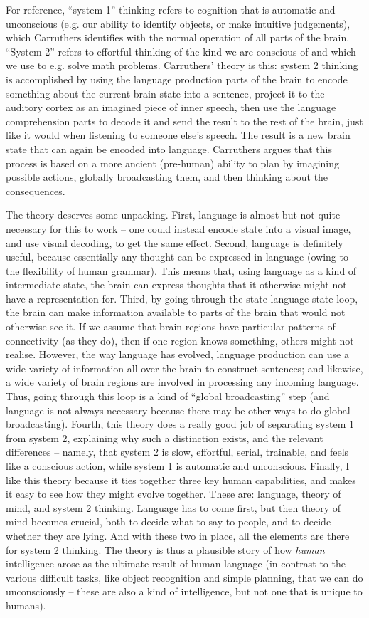 \documentclass[10pt,a4paper]{article}
\newcommand{\nquote}[1]{``{#1}''}
\begin{document}
For reference, \nquote{system 1} thinking refers to cognition that is automatic and unconscious (e.g. our ability to identify objects, or make intuitive judgements), which Carruthers identifies with the normal operation of all parts of the brain. \nquote{System 2} refers to effortful thinking of the kind we are conscious of and which we use to e.g. solve math problems. Carruthers' theory is this: system 2 thinking is accomplished by using the language production parts of the brain to encode something about the current brain state into a sentence, project it to the auditory cortex as an imagined piece of inner speech, then use the language comprehension parts to decode it and send the result to the rest of the brain, just like it would when listening to someone else's speech. The result is a new brain state that can again be encoded into language. Carruthers argues that this process is based on a more ancient (pre-human) ability to plan by imagining possible actions, globally broadcasting them, and then thinking about the consequences.

The theory deserves some unpacking. First, language is almost but not quite necessary for this to work -- one could instead encode state into a visual image, and use visual decoding, to get the same effect. Second, language is definitely useful, because essentially any thought can be expressed in language (owing to the flexibility of human grammar). This means that, using language as a kind of intermediate state, the brain can express thoughts that it otherwise might not have a representation for. Third, by going through the state-language-state loop, the brain can make information available to parts of the brain that would not otherwise see it. If we assume that brain regions have particular patterns of connectivity (as they do), then if one region knows something, others might not realise. However, the way language has evolved, language production can use a wide variety of information all over the brain to construct sentences; and likewise, a wide variety of brain regions are involved in processing any incoming language. Thus, going through this loop is a kind of \nquote{global broadcasting} step (and language is not always necessary because there may be other ways to do global broadcasting). Fourth, this theory does a really good job of separating system 1 from system 2, explaining why such a distinction exists, and the relevant differences -- namely, that system 2 is slow, effortful, serial, trainable, and feels like a conscious action, while system 1 is automatic and unconscious. Finally, I like this theory because it ties together three key human capabilities, and makes it easy to see how they might evolve together. These are: language, theory of mind, and system 2 thinking. Language has to come first, but then theory of mind becomes crucial, both to decide what to say to people, and to decide whether they are lying. And with these two in place, all the elements are there for system 2 thinking. The theory is thus a plausible story of how \emph{human} intelligence arose as the ultimate result of human language (in contrast to the various difficult tasks, like object recognition and simple planning, that we can do unconsciously -- these are also a kind of intelligence, but not one that is unique to humans).
\end{document}
